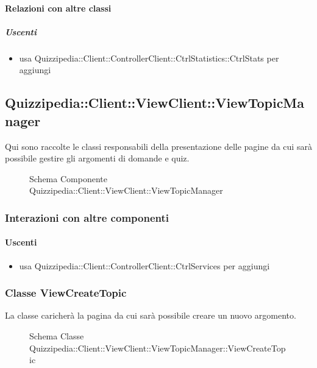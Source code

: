 \paragraph{Relazioni con altre classi}
\subparagraph{Uscenti}
\begin{itemize}
\item usa Quizzipedia::Client::ControllerClient::CtrlStatistics::CtrlStats per aggiungi
\end{itemize}
\subsection{Quizzipedia::Client::ViewClient::ViewTopicManager}
Qui sono raccolte le classi responsabili della presentazione delle pagine da cui sarà possibile gestire gli argomenti di domande e quiz.
\begin{figure}[H]
\centering
\noindent{}
\caption[Schema Componente Quizzipedia::Client::ViewClient::ViewTopicManager]{Schema Componente Quizzipedia::Client::ViewClient::ViewTopicManager}
\end{figure}
\subsubsection{Interazioni con altre componenti}
\paragraph{Uscenti}
\begin{itemize}
\item usa Quizzipedia::Client::ControllerClient::CtrlServices per aggiungi
\end{itemize}
\subsubsection{Classe ViewCreateTopic}
La classe caricherà la pagina da cui sarà possibile creare un nuovo argomento.
\begin{figure}[H]
\centering
\noindent{}
\caption[Schema Classe ViewCreateTopic]{Schema Classe Quizzipedia::Client::ViewClient::ViewTopicManager::ViewCreateTopic}
\end{figure}
